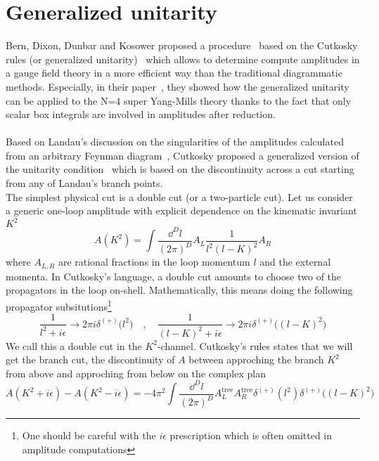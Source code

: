 \section{Generalized unitarity}\label{sect-unitarity}
Bern, Dixon, Dunbar and Kosower proposed a procedure~\cite{Bern:1994zx} based on the Cutkosky rules (or generalized unitarity)~\cite{doi:10.1063/1.1703676} which allows to determine compute amplitudes in a gauge field theory in a more efficient way than the traditional diagrammatic methods. 
Especially, in their paper~\cite{Bern:1994zx}, they showed how the generalized unitarity can be applied to the N=4 super Yang-Mills theory thanks to the fact that only scalar box integrals are involved in amplitudes after reduction.
\\\\
Based on Landau's discussion on the singularities of the amplitudes calculated from an arbitrary Feynman diagram~\cite{LANDAU1959181}, 
Cutkosky proposed a generalized version of the unitarity condition~\cite{doi:10.1063/1.1703676} which is based on the discontinuity across a cut starting from any of Landau's branch points.
\\
The simplest physical cut is a double cut (or a two-particle cut).
Let us consider a generic one-loop amplitude with explicit dependence on the kinematic invariant $K^2$
\begin{equation}
A(K^2) = \int\frac{\dd^D l}{(2\pi)^D} A_L\frac{1}{l^{2} (l-K)^{2}}A_R
\end{equation}
where $A_{L,R}$ are rational fractions in the loop momentum $l$ and the external momenta. 
In Cutkosky's language, a double cut amounts to choose two of the propagators in the loop on-shell.
Mathematically, this means doing the following propagator subsitutions\footnote{One should be careful with the $i\epsilon$ prescription which is often omitted in amplitude computations}
\begin{equation}\label{on-shell_propagator}
\frac{1}{l^2 + i\epsilon} \rightarrow 2\pi i\delta^{(+)}\big(l^2\big)
\quad,\quad
\frac{1}{(l-K)^2 + i\epsilon} \rightarrow 2\pi i\delta^{(+)}\big((l-K)^2\big)
\end{equation}
We call this a double cut in the $K^2$-channel.
Cutkosky's rules states that we will get the branch cut, \ie the discontinuity of $A$ between approching the branch $K^2$ from above and approching from below on the complex plan
\begin{equation}\label{cutkosky}
A(K^2 + i\epsilon) - A(K^2 - i\epsilon) =
-4\pi^2 \int\frac{\dd^D l}{(2\pi)^D}A^{\mathrm{tree}}_LA^{\mathrm{tree}}_R \delta^{(+)}(l^2)\delta^{(+)}\big((l-K)^2\big) 
\end{equation}
